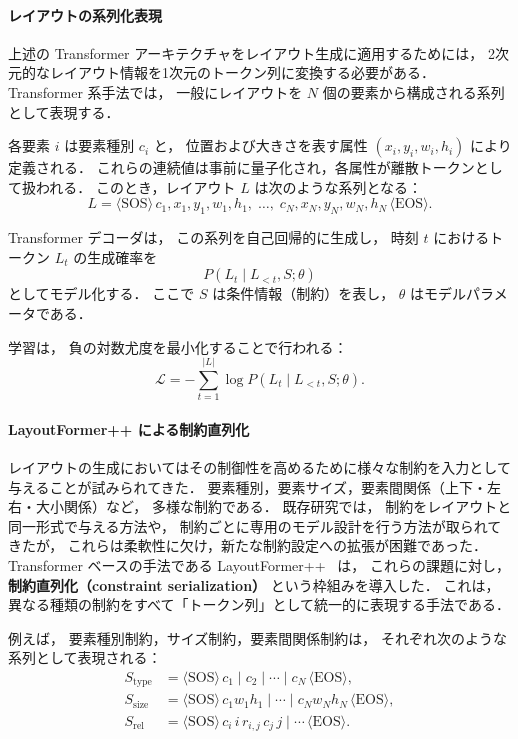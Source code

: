 \documentclass[a4j,12pt,dvipdfmx]{jsreport}
\begin{document}
\paragraph{レイアウトの系列化表現}
上述の Transformer アーキテクチャをレイアウト生成に適用するためには，
2次元的なレイアウト情報を1次元のトークン列に変換する必要がある．
Transformer 系手法では，
一般にレイアウトを $N$ 個の要素から構成される系列として表現する．

各要素 $i$ は要素種別 $c_i$ と，
位置および大きさを表す属性 $(x_i, y_i, w_i, h_i)$ により定義される．
これらの連続値は事前に量子化され，各属性が離散トークンとして扱われる．
このとき，レイアウト $L$ は次のような系列となる：
\begin{equation}
   L =
   \langle \mathrm{SOS} \rangle\,
   c_1, x_1, y_1, w_1, h_1,\;
   \ldots,\;
   c_N, x_N, y_N, w_N, h_N\,
   \langle \mathrm{EOS} \rangle .
\end{equation}

Transformer デコーダは，
この系列を自己回帰的に生成し，
時刻 $t$ におけるトークン $L_t$ の生成確率を
\begin{equation}
   P(L_t \mid L_{<t}, S; \theta)
\end{equation}
としてモデル化する．
ここで $S$ は条件情報（制約）を表し，
$\theta$ はモデルパラメータである．

学習は，
負の対数尤度を最小化することで行われる：
\begin{equation}
   \mathcal{L}
   =
   -\sum_{t=1}^{|L|}
   \log P(L_t \mid L_{<t}, S; \theta).
\end{equation}

\paragraph{LayoutFormer++ による制約直列化}
レイアウトの生成においてはその制御性を高めるために様々な制約を入力として与えることが試みられてきた．
要素種別，要素サイズ，要素間関係（上下・左右・大小関係）など，
多様な制約である．
既存研究では，
制約をレイアウトと同一形式で与える方法や，
制約ごとに専用のモデル設計を行う方法が取られてきたが，
これらは柔軟性に欠け，新たな制約設定への拡張が困難であった．
Transformer ベースの手法である LayoutFormer++~\cite{jiang_layoutformer_2023} は，
これらの課題に対し，
\textbf{制約直列化（constraint serialization）}
という枠組みを導入した．
これは，異なる種類の制約をすべて「トークン列」として統一的に表現する手法である．

例えば，
要素種別制約，サイズ制約，要素間関係制約は，
それぞれ次のような系列として表現される：
\begin{align}
   S_{\text{type}} & = \langle \mathrm{SOS} \rangle\, c_1 \mid c_2 \mid \cdots \mid c_N \,\langle \mathrm{EOS} \rangle,        \\
   S_{\text{size}} & = \langle \mathrm{SOS} \rangle\, c_1 w_1 h_1 \mid \cdots \mid c_N w_N h_N \,\langle \mathrm{EOS} \rangle, \\
   S_{\text{rel}}  & = \langle \mathrm{SOS} \rangle\, c_i\, i\, r_{i,j}\, c_j\, j \mid \cdots \,\langle \mathrm{EOS} \rangle .
\end{align}
\end{document}
